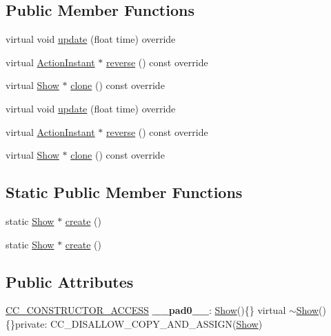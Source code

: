 \subsection*{Public Member Functions}
\begin{DoxyCompactItemize}
\item 
virtual void \hyperlink{classShow_a81b501eda1e567344ad4ecf695b1be86}{update} (float time) override
\item 
virtual \hyperlink{classActionInstant}{Action\+Instant} $\ast$ \hyperlink{classShow_a986a611688bc5f0252bb565682f52571}{reverse} () const override
\item 
virtual \hyperlink{classShow}{Show} $\ast$ \hyperlink{classShow_a0832b6fc1f6fcabc9284f0707d95881d}{clone} () const override
\item 
virtual void \hyperlink{classShow_a83db57e795e0269471d06d4e49986ab0}{update} (float time) override
\item 
virtual \hyperlink{classActionInstant}{Action\+Instant} $\ast$ \hyperlink{classShow_a0fdc7cbefad3afaecfc0b8fdc71e9814}{reverse} () const override
\item 
virtual \hyperlink{classShow}{Show} $\ast$ \hyperlink{classShow_a32b347c4d1fbd6336975903a3a2e8991}{clone} () const override
\end{DoxyCompactItemize}
\subsection*{Static Public Member Functions}
\begin{DoxyCompactItemize}
\item 
static \hyperlink{classShow}{Show} $\ast$ \hyperlink{classShow_a769dba1bfa26dae65242d6aa4a217f19}{create} ()
\item 
static \hyperlink{classShow}{Show} $\ast$ \hyperlink{classShow_a5310b43324109bc4d12bd2b42eaceced}{create} ()
\end{DoxyCompactItemize}
\subsection*{Public Attributes}
\begin{DoxyCompactItemize}
\item 
\mbox{\label{classShow_a28c214039bc30d3b97fec69a40953561}} 
\hyperlink{_2cocos2d_2cocos_2base_2ccConfig_8h_a25ef1314f97c35a2ed3d029b0ead6da0}{C\+C\+\_\+\+C\+O\+N\+S\+T\+R\+U\+C\+T\+O\+R\+\_\+\+A\+C\+C\+E\+SS} {\bfseries \+\_\+\+\_\+pad0\+\_\+\+\_\+}\+: \hyperlink{classShow}{Show}()\{\} virtual $\sim$\hyperlink{classShow}{Show}()\{\}private\+: C\+C\+\_\+\+D\+I\+S\+A\+L\+L\+O\+W\+\_\+\+C\+O\+P\+Y\+\_\+\+A\+N\+D\+\_\+\+A\+S\+S\+I\+GN(\hyperlink{classShow}{Show})
\end{DoxyCompactItemize}
